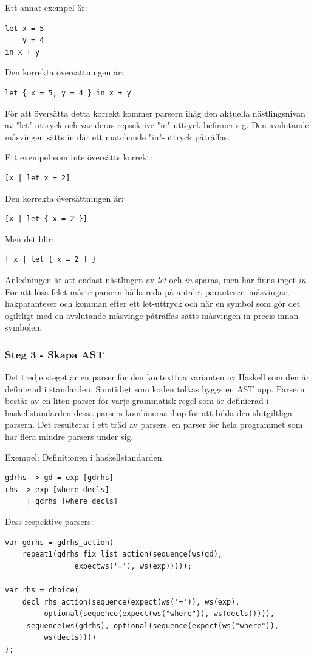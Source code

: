 Ett annat exempel är:
\begin{lstlisting}
let x = 5
    y = 4
in x + y
\end{lstlisting}
Den korrekta översättningen är:
\begin{lstlisting}
let { x = 5; y = 4 } in x + y
\end{lstlisting}
För att översätta detta korrekt kommer parsern ihåg den aktuella nästlingsnivån av "let"-uttryck och var deras repsektive "in"-uttryck befinner sig. 
Den avslutande måsvingen sätts in där ett matchande "in"-uttryck påträffas.

Ett exempel som inte översätts korrekt:
\begin{lstlisting}
[x | let x = 2]
\end{lstlisting}
Den korrekta översättningen är:
\begin{lstlisting}
[x | let { x = 2 }]
\end{lstlisting}
Men det blir:
\begin{lstlisting}
[ x | let { x = 2 ] }
\end{lstlisting}
Anledningen är att endast nästlingen av \emph{let} och \emph{in} sparas, men här finns inget \emph{in}.
För att lösa felet måste parsern hålla reda på antalet paranteser, måsvingar, hakparanteser och komman efter ett let-uttryck och när en symbol som gör det ogiltligt 
med en avslutande måsvinge påträffas sätts måsvingen in precis innan symbolen.

\subsubsection{Steg 3 - Skapa AST}
Det tredje steget är en parser för den kontextfria varianten av Haskell som den är definierad i standarden. 
Samtidigt som koden tolkas byggs en AST upp. Parsern består av en liten parser för varje grammatisk regel som är definierad i haskellstandarden 
dessa parsers kombineras ihop för att bilda den slutgiltliga parsern. Det resulterar i ett träd av parsers, en parser för hela programmet som har flera mindre parsers under sig.

Exempel:
Definitionen i haskellstandarden:
\begin{lstlisting}
gdrhs -> gd = exp [gdrhs]
rhs -> exp [where decls]
     | gdrhs [where decls]
\end{lstlisting}
Dess respektive parsers:
\begin{lstlisting}
var gdrhs = gdrhs_action(
    repeat1(gdrhs_fix_list_action(sequence(ws(gd), 
                expectws('='), ws(exp)))));

var rhs = choice(
    decl_rhs_action(sequence(expect(ws('=')), ws(exp), 
         optional(sequence(expect(ws("where")), ws(decls))))),
     sequence(ws(gdrhs), optional(sequence(expect(ws("where")), 
         ws(decls))))
);
\end{lstlisting}

